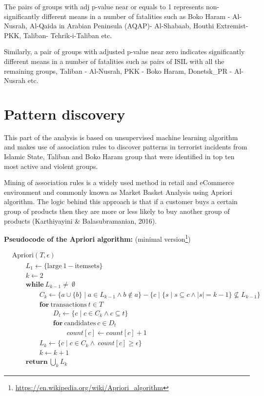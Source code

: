 \documentclass[11pt,oneside,a4paper]{reedthesis}
\begin{document}
The pairs of groups with adj p-value near or equals to 1 represents
non-significantly different means in a number of fatalities such as Boko
Haram - Al-Nusrah, Al-Qaida in Arabian Peninsula (AQAP)- Al-Shabaab,
Houthi Extremist- PKK, Taliban- Tehrik-i-Taliban etc.

Similarly, a pair of groups with adjusted p-value near zero indicates
significantly different means in a number of fatalities such as pairs of
ISIL with all the remaining groups, Taliban - Al-Nusrah, PKK - Boko
Haram, Donetsk\_PR - Al-Nusrah etc.

\chapter{Pattern discovery}\label{pattern-discovery}

This part of the analysis is based on unsupervised machine learning
algorithm and makes use of association rules to discover patterns in
terrorist incidents from Islamic State, Taliban and Boko Haram group
that were identified in top ten most active and violent groups.

Mining of association rules is a widely used method in retail and
eCommerce environment and commonly known as Market Basket Analysis using
Apriori algorithm. The logic behind this approach is that if a customer
buys a certain group of products then they are more or less likely to
buy another group of products (Karthiyayini \& Balasubramanian, 2016).

\textbf{Pseudocode of the Apriori algorithm:} (minimal version\footnote{\url{https://en.wikipedia.org/wiki/Apriori_algorithm}})

\[
\begin{aligned}
& \mathrm{Apriori}(T,\epsilon)\\
&\qquad L_1 \gets \{ \mathrm{large~1-item sets} \} \\
&\qquad k \gets 2\\
&\qquad \mathrm{\textbf{while}}~ L_{k-1} \neq \ \emptyset \\
&\qquad \qquad C_k \gets \{ a \cup \{b\} \mid a \in L_{k-1} \land b \not \in a \} - \{ c \mid \{ s \mid s \subseteq c \land |s| = k-1 \} \nsubseteq L_{k-1} \}\\
&\qquad \qquad \mathrm{\textbf{for}~transactions}~t \in T\\
&\qquad \qquad\qquad D_t \gets \{ c \mid c \in C_k \land c \subseteq t \} \\
&\qquad \qquad\qquad \mathrm{\textbf{for}~candidates}~c \in D_t\\
&\qquad \qquad\qquad\qquad \mathit{count}[c] \gets \mathit{count}[c]+1\\
&\qquad \qquad L_k \gets \{ c \mid c \in C_k \land ~ \mathit{count}[c] \geq \epsilon \}\\
&\qquad \qquad k \gets k+1\\
&\qquad \mathrm{\textbf{return}}~\bigcup_k L_k
\end{aligned}
\]
\end{document}
